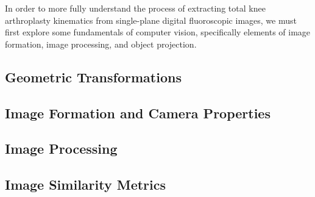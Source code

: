 In order to more fully understand the process of extracting total knee arthroplasty kinematics from single-plane digital fluoroscopic images, we must first explore some fundamentals of computer vision, specifically elements of image formation, image processing, and object projection.

\subsection{Geometric Transformations}
\label{sec:geometric-transformations}


\subsection{Image Formation and Camera Properties}
\label{sec:img-form-camera-props}


\subsection{Image Processing}
\label{sec:image-processing}


\subsection{Image Similarity Metrics}
\label{sec:image-similarity}

